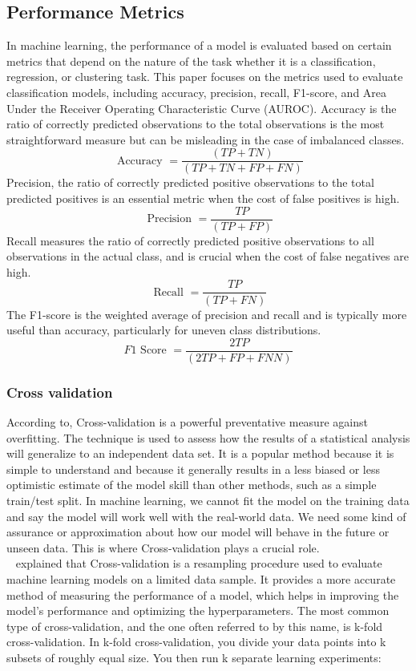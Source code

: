 \documentclass[12pt]{report}
\begin{document}
\subsection*{Performance Metrics}
In machine learning, the performance of a model is evaluated based on certain
metrics that depend on the nature of the task whether it is a classification,
regression, or clustering task. This paper focuses on the metrics used to
evaluate classification models, including accuracy, precision, recall,
F1-score, and Area Under the Receiver Operating Characteristic Curve (AUROC).
Accuracy is the ratio of correctly predicted observations to the total
observations is the most straightforward measure but can be misleading in the
case of imbalanced classes\cite{powers2011evaluation}.\[ \text { Accuracy }=\frac{(T P+T N)}{(T P+T N+F P+F N)} \] Precision, the ratio of correctly predicted positive observations to the total
predicted positives is an essential metric when the cost of false positives is
high\cite{sokolova2009systematic}.\[ \text { Precision }=\frac{T P}{(T P+F P)} \]
Recall measures the ratio of correctly predicted positive observations to all
observations in the actual class, and is crucial when the cost of false
negatives are high\cite{sokolova2009systematic}.\[ \text { Recall }=\frac{T P}{(T P+F N)} \] The F1-score is the weighted average of precision and recall and is typically
more useful than accuracy, particularly for uneven class
distributions\cite{van1979information}. \[ F 1 \text { Score }=\frac{2 T P}{(2T P+F P+F N N)} \]

\subsubsection{Cross validation}
According to\cite{kohavi1995}, Cross-validation is a powerful preventative
measure against overfitting. The technique is used to assess how the results of
a statistical analysis will generalize to an independent data set. It is a
popular method because it is simple to understand and because it generally
results in a less biased or less optimistic estimate of the model skill than
other methods, such as a simple train/test split. In machine learning, we
cannot fit the model on the training data and say the model will work well with
the real-world data. We need some kind of assurance or approximation about how
our model will behave in the future or unseen data. This is where
Cross-validation plays a crucial role.\\

~\cite{kohavi1995} explained that Cross-validation is a resampling procedure used to
evaluate machine learning models on a limited data sample. It provides a more accurate
method of measuring the performance of a model, which helps in improving the model's performance
and optimizing the hyperparameters. The most common type of cross-validation, and the one often
referred to by this name, is k-fold cross-validation. In k-fold cross-validation, you divide your
data points into k subsets of roughly equal size. You then run k separate learning experiments:
\end{document}
